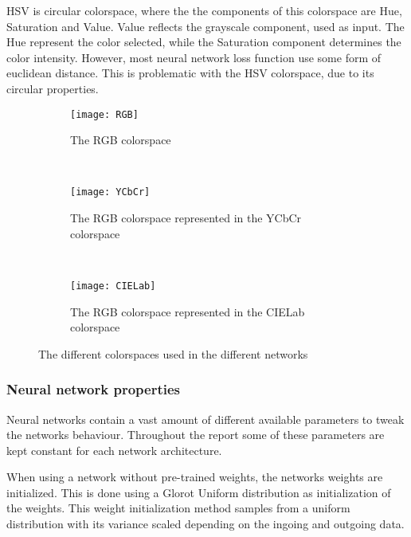HSV is circular colorspace, where the the components of this colorspace are Hue, Saturation and Value. Value reflects the grayscale component, used as input. The Hue represent the color selected, while the Saturation component determines the color intensity. 
However, most neural network loss function use some form of euclidean distance. This is problematic with the HSV colorspace, due to its circular properties. 

\begin{figure}
	\centering
	\begin{subfigure}[b]{0.32\textwidth}
		\texttt{[image: RGB]}
		\caption{The RGB colorspace}
		\label{fig:RGB}
	\end{subfigure}
	~ %
	\begin{subfigure}[b]{0.32\textwidth}
		\texttt{[image: YCbCr]}
		\caption{The RGB colorspace represented in the YCbCr colorspace}
		\label{fig:YCbCr}
	\end{subfigure}
	~ %
	\begin{subfigure}[b]{0.32\textwidth}
		\texttt{[image: CIELab]}
		\caption{The RGB colorspace represented in the CIELab colorspace}
		\label{fig:CIELab}
	\end{subfigure}
	\caption{The different colorspaces used in the different networks}\label{fig:animals}
\end{figure}


\subsubsection{Neural network properties}
\label{sec:nnproperties}
Neural networks contain a vast amount of different available parameters to tweak the networks behaviour. Throughout the report some of these parameters are kept constant for each network architecture. 

When using a network without pre-trained weights, the networks weights are initialized. This is done using a Glorot Uniform distribution \cite{Glorot} as initialization of the weights. This weight initialization method samples from a uniform distribution with its variance scaled depending on the ingoing and outgoing data. %

